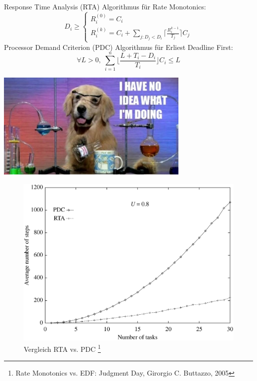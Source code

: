 \begin{frame}{\subsecname}
	Response Time Analysis (RTA) Algorithmus für Rate Monotonics:
	\begin{equation}
		D_i \geq
		\begin{cases}
   				R_i^{(0)}=C_i \\
   				R_i^{(k)}=C_i+ \sum_{j:D_j<D_i} \lceil \frac{R_i^{k-1}}{T_j}\rceil C_j
  		\end{cases}
	\end{equation}
	Processor Demand Criterion (PDC) Algorithmus für Erliest Deadline First:
	\begin{equation}
		\forall L > 0,\; \sum_{i=1}^n\lfloor \frac{L+T_i-D_i}{T_i}\rfloor C_i \leq L
	\end{equation}
\end{frame}

\begin{frame}
	\begin{center}
		\includegraphics[width=0.7\textwidth]{graphics/memes/sciencedog.jpg}
	\end{center}
\end{frame}

\begin{frame}{\subsecname}
	\begin{center}
	\begin{figure}
		\includegraphics[scale=.20]{graphics/vergleich/rtapdc.png}
		\caption{Vergleich RTA vs. PDC \footnote{Rate Monotonics vs. EDF: Judgment Day, Girorgio C. Buttazzo, 2005}}	
	\end{figure}

	\end{center}
\end{frame}

